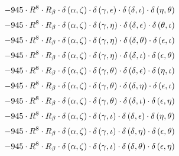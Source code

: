 \begin{subequations}
\begin{gather}
 \\[0.2em] \notag 		 - 945 \cdot R^{8} \cdot R_{\beta{}} \cdot \delta{}\left(\alpha{}, \zeta{}\right) \cdot \delta{}\left(\gamma{}, \epsilon{}\right) \cdot \delta{}\left(\delta{}, \iota{}\right) \cdot \delta{}\left(\eta{}, \theta{}\right) 
 \\[0.2em] \notag 		 - 945 \cdot R^{8} \cdot R_{\beta{}} \cdot \delta{}\left(\alpha{}, \zeta{}\right) \cdot \delta{}\left(\gamma{}, \eta{}\right) \cdot \delta{}\left(\delta{}, \epsilon{}\right) \cdot \delta{}\left(\theta{}, \iota{}\right) 
 \\[0.2em] \notag 		 - 945 \cdot R^{8} \cdot R_{\beta{}} \cdot \delta{}\left(\alpha{}, \zeta{}\right) \cdot \delta{}\left(\gamma{}, \eta{}\right) \cdot \delta{}\left(\delta{}, \theta{}\right) \cdot \delta{}\left(\epsilon{}, \iota{}\right) 
 \\[0.2em] \notag 		 - 945 \cdot R^{8} \cdot R_{\beta{}} \cdot \delta{}\left(\alpha{}, \zeta{}\right) \cdot \delta{}\left(\gamma{}, \eta{}\right) \cdot \delta{}\left(\delta{}, \iota{}\right) \cdot \delta{}\left(\epsilon{}, \theta{}\right) 
 \\[0.2em] \notag 		 - 945 \cdot R^{8} \cdot R_{\beta{}} \cdot \delta{}\left(\alpha{}, \zeta{}\right) \cdot \delta{}\left(\gamma{}, \theta{}\right) \cdot \delta{}\left(\delta{}, \epsilon{}\right) \cdot \delta{}\left(\eta{}, \iota{}\right) 
 \\[0.2em] \notag 		 - 945 \cdot R^{8} \cdot R_{\beta{}} \cdot \delta{}\left(\alpha{}, \zeta{}\right) \cdot \delta{}\left(\gamma{}, \theta{}\right) \cdot \delta{}\left(\delta{}, \eta{}\right) \cdot \delta{}\left(\epsilon{}, \iota{}\right) 
 \\[0.2em] \notag 		 - 945 \cdot R^{8} \cdot R_{\beta{}} \cdot \delta{}\left(\alpha{}, \zeta{}\right) \cdot \delta{}\left(\gamma{}, \theta{}\right) \cdot \delta{}\left(\delta{}, \iota{}\right) \cdot \delta{}\left(\epsilon{}, \eta{}\right) 
 \\[0.2em] \notag 		 - 945 \cdot R^{8} \cdot R_{\beta{}} \cdot \delta{}\left(\alpha{}, \zeta{}\right) \cdot \delta{}\left(\gamma{}, \iota{}\right) \cdot \delta{}\left(\delta{}, \epsilon{}\right) \cdot \delta{}\left(\eta{}, \theta{}\right) 
 \\[0.2em] \notag 		 - 945 \cdot R^{8} \cdot R_{\beta{}} \cdot \delta{}\left(\alpha{}, \zeta{}\right) \cdot \delta{}\left(\gamma{}, \iota{}\right) \cdot \delta{}\left(\delta{}, \eta{}\right) \cdot \delta{}\left(\epsilon{}, \theta{}\right) 
 \\[0.2em] \notag 		 - 945 \cdot R^{8} \cdot R_{\beta{}} \cdot \delta{}\left(\alpha{}, \zeta{}\right) \cdot \delta{}\left(\gamma{}, \iota{}\right) \cdot \delta{}\left(\delta{}, \theta{}\right) \cdot \delta{}\left(\epsilon{}, \eta{}\right) 

\end{gather}
\end{subequations}
